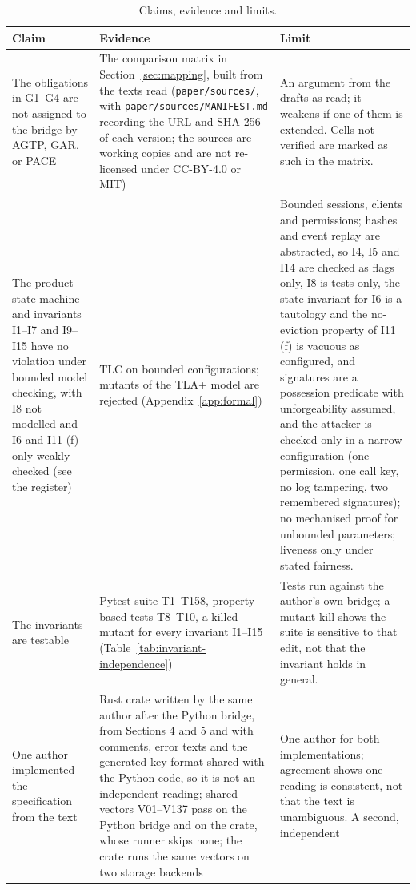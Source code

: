 \begin{table}[htbp]
\centering
\caption{Claims, evidence and limits.}
\label{tab:claims}
\footnotesize
\begin{tabularx}{\columnwidth}{X X X}
\toprule
\textbf{Claim} & \textbf{Evidence} & \textbf{Limit} \\
\midrule
The obligations in G1--G4 are not assigned to the bridge by AGTP, GAR, or PACE &
The comparison matrix in Section~\ref{sec:mapping}, built from the texts read
(\texttt{paper/sources/}, with \texttt{paper/sources/MANIFEST.md}
recording the URL and SHA-256 of each version; the sources are working
copies and are not re-licensed under CC-BY-4.0 or MIT) &
An argument from the drafts as read; it weakens if one of them is extended.
Cells not verified are marked as such in the matrix. \\
The product state machine and invariants I1--I7 and I9--I15 have no violation under bounded model checking, with I8 not modelled and I6 and I11 (f) only weakly checked (see the register) &
TLC on bounded configurations; mutants of the TLA+ model are rejected
(Appendix~\ref{app:formal}) &
Bounded sessions, clients and permissions; hashes and event
replay are abstracted, so I4, I5 and I14 are checked as flags only, I8 is tests-only, the state invariant for I6 is a tautology and the no-eviction property of I11 (f) is vacuous as configured, and signatures
are a possession predicate with unforgeability assumed, and the attacker is checked only in a narrow configuration (one permission, one call key, no log tampering, two remembered signatures); no mechanised proof for unbounded parameters;
liveness only under stated fairness. \\
The invariants are testable &
Pytest suite T1--T158, property-based tests T8--T10, a killed mutant for
every invariant I1--I15 (Table~\ref{tab:invariant-independence}) &
Tests run against the author's own bridge; a mutant kill shows the suite
is sensitive to that edit, not that the invariant holds in general. \\
One author implemented the specification from the text &
Rust crate written by the same author after the Python bridge, from
Sections 4 and 5 and with comments, error texts and the generated key
format shared with the Python code, so it is not an independent reading; shared vectors V01--V137 pass on the Python bridge and on the
crate, whose runner skips none; the crate runs the same vectors on two storage backends &
One author for both implementations; agreement shows one reading is
consistent, not that the text is unambiguous. A second, independent

\end{tabularx}
\end{table}
